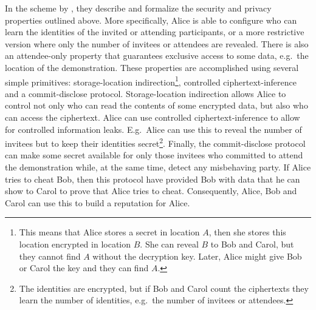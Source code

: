 In the scheme by \textcite{EventsInvitations}, they describe and formalize the 
security and privacy properties outlined above.
More specifically, Alice is able to configure who can learn the identities of 
the invited or attending participants, or a more restrictive version where only 
the number of invitees or attendees are revealed.
There is also an attendee-only property that guarantees exclusive access to 
some data, e.g.\ the location of the demonstration.
These properties are accomplished using several simple primitives:
storage-location indirection\footnote{%
  This means that Alice stores a secret in location \(A\), then she stores this
  location encrypted in location \(B\).
  She can reveal \(B\) to Bob and Carol, but they cannot find \(A\) without the
  decryption key.
  Later, Alice might give Bob or Carol the key and they can find \(A\).
},
controlled ciphertext-inference and
a commit-disclose protocol.
Storage-location indirection allows Alice to control not only who can read the 
contents of some encrypted data, but also who can access the ciphertext.
Alice can use controlled ciphertext-inference to allow for controlled 
information leaks.
E.g.\ Alice can use this to reveal the number of invitees but to keep their 
identities secret\footnote{%
  The identities are encrypted, but if Bob and Carol count the ciphertexts they
  learn the number of identities, e.g.\ the number of invitees or attendees.
}.
Finally, the commit-disclose protocol can make some secret available for only 
those invitees who committed to attend the demonstration while, at the same 
time, detect any misbehaving party.
If Alice tries to cheat Bob, then this protocol have provided Bob with data 
that he can show to Carol to prove that Alice tries to cheat.
Consequently, Alice, Bob and Carol can use this to build a reputation for 
Alice.
